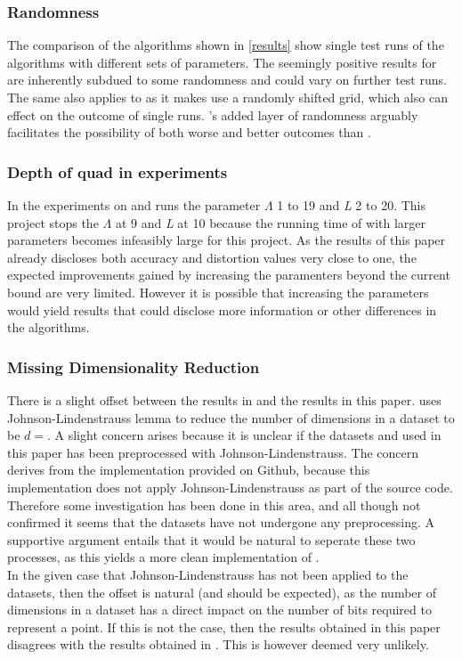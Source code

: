\subsubsection{Randomness}
\label{disc/threats/randomness}
The comparison of the algorithms shown in \ref{results} show single test runs of the algorithms with different sets of parameters. The seemingly positive results for \qsr{} are inherently subdued to some randomness and could vary on further test runs. The same also applies to \qs{} as it makes use a randomly shifted grid, which also can effect on the outcome of single runs. \qsr{}'s added layer of randomness arguably facilitates the possibility of both worse and better outcomes than \qs{}.

\subsubsection{Depth of quad in experiments}
\label{disc/threats/depth}
In \cite{wagner17} the experiments on \qs{} and \grid{} runs the parameter $\Lambda$ 1 to 19 and \textit{L} 2 to 20. This project stops the $\Lambda$ at 9 and \textit{L} at 10 because the running time of \qs{} with larger parameters becomes infeasibly large for this project. As the results of this paper already discloses both accuracy and distortion values very close to one, the expected improvements gained by increasing the paramenters beyond the current bound are very limited. However it is possible that increasing the parameters would yield results that could disclose more information or other differences in the algorithms.

\subsubsection{Missing Dimensionality Reduction}
There is a slight offset between the results in \cite{wagner17} and the results in this paper. \cite{wagner17} uses Johnson-Lindenstrauss lemma to reduce the number of dimensions in a dataset to be $d=$. A slight concern arises because it is unclear if the datasets \mnist{} and \sift{} used in this paper has been preprocessed with Johnson-Lindenstrauss. The concern derives from the \qs{} implementation provided on Github, because this implementation does not apply Johnson-Lindenstrauss as part of the source code. Therefore some investigation has been done in this area, and all though not confirmed it seems that the datasets have not undergone any preprocessing. A supportive argument entails that it would be natural to seperate these two processes, as this yields a more clean implementation of \qs{}. 
\\
In the given case that Johnson-Lindenstrauss has not been applied to the datasets, then the offset is natural (and should be expected), as the number of dimensions in a dataset has a direct impact on the number of bits required to represent a point. If this is not the case, then the results obtained in this paper disagrees with the results obtained in \cite{wagner17}. This is however deemed very unlikely. 
